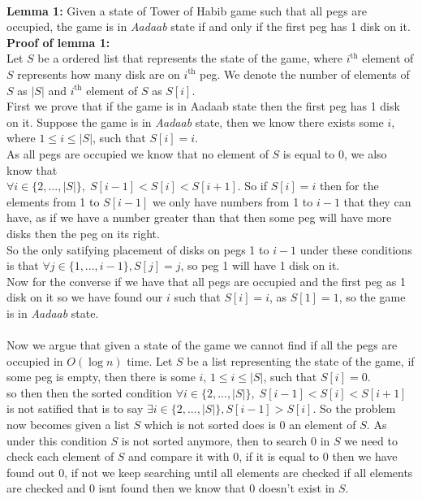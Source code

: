 \documentclass[addpoints]{exam}
\begin{document}
\begin{questions}
	\begin{solution}
		\\\textbf{Lemma 1:} Given a state of Tower of Habib game such that all pegs are occupied, the game is in \textit{Aadaab} state if and only if the first peg has 1 disk on it.
		\\\textbf{Proof of lemma 1:}
		\\Let $S$ be a ordered list that represents the state of the game, where $i^{\text{th}}$ element of $S$ represents how many disk are on $i^{\text{th}}$ peg.  We denote the number of elements of $S$ as $|S|$ and $i^{\text{th}}$ element of $S$ as $S[i]$.
		\\First we prove that if the game is in Aadaab state then the first peg has 1 disk on it.
		Suppose the game is in \textit{Aadaab} state, then we know there exists some $i$, where $1\leq i\leq |S|$, such that $S[i] = i$.
		\\As all pegs are occupied we know that no element of $S$ is equal to $0$, we also know that \\$\forall i \in \{2,..., |S|\}, \;S[i-1] < S[i] < S[i+1]$.
			So if $S[i] = i$ then for the elements from 1 to $S[i-1]$ we only have numbers from 1 to $i-1$ that they can have, as if we have a number greater than that then some peg will have more disks then the peg on its right.
			\\So the only satifying placement of disks on pegs 1 to $i-1$ under these conditions is that $\forall j \in \{1,..., i-1\}, S[j] = j$, so peg 1 will have 1 disk on it.
			\\Now for the converse if we have that all pegs are occupied and the first peg as 1 disk on it so we have found our $i$ such that $S[i] = i$, as $S[1] = 1$, so the game is in \textit{Aadaab} state.
			\\\\Now we argue that given a state of the game we cannot find if all the pegs are occupied in $O(\log n)$ time. Let $S$ be a list representing the state of the game, if some peg is empty, then there is some $i$, $1 \leq i \leq |S|$, such that $S[i] = 0$.
			\\so then then the sorted condition $\forall i \in \{2,..., |S|\}, \;S[i-1] < S[i] < S[i+1]$ is not satified that is to say $\exists i \in \{2,..., |S|\}, S[i-1] > S[i]$. So the problem now becomes given a list $S$ which is not sorted does is 0 an element of $S$.
			As under this condition $S$ is not sorted anymore, then to search 0 in $S$ we need to check each element of $S$ and compare it with $0$, if it is equal to $0$ then we have found out $0$, if not we keep searching until all elements are checked if all elements are checked and 0 isnt found then we know that 0 doesn't exist in $S$.

\end{solution}
\end{questions}
\end{document}
